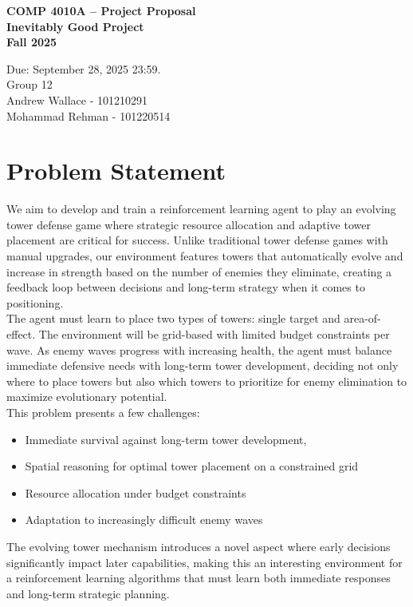 \documentclass[12pt]{article}
\begin{document}
 

\begin{center} \Large\bf
COMP 4010A -- Project Proposal\\
Inevitably Good Project \\
Fall 2025
\end{center} 

\begin{center}
Due: September 28, 2025 23:59. \\
Group 12 \\
Andrew Wallace - 101210291\\
Mohammad Rehman - 101220514
\end{center}

\section{Problem Statement}
We aim to develop and train a reinforcement learning agent to play an evolving tower defense game where strategic resource allocation and adaptive tower placement are critical for success. Unlike traditional tower defense games with manual upgrades, our environment features towers that automatically evolve and increase in strength based on the number of enemies they eliminate, creating a feedback loop between decisions and long-term strategy when it comes to positioning.\\

\noindent The agent must learn to place two types of towers: single target and area-of-effect. The environment will be grid-based with limited budget constraints per wave. As enemy waves progress with increasing health, the agent must balance immediate defensive needs with long-term tower development, deciding not only where to place towers but also which towers to prioritize for enemy elimination to maximize evolutionary potential.\\

\noindent This problem presents a few challenges: 
\begin{itemize}
    \item Immediate survival against long-term tower development,
    \item Spatial reasoning for optimal tower placement on a constrained grid
    \item Resource allocation under budget constraints
    \item Adaptation to increasingly difficult enemy waves
\end{itemize}
The evolving tower mechanism introduces a novel aspect where early decisions significantly impact later capabilities, making this an interesting environment for a reinforcement learning algorithms that must learn both immediate responses and long-term strategic planning.
\end{document}
